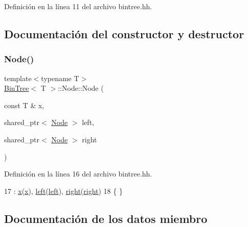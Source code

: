 Definición en la línea 11 del archivo bintree.\+hh.



\subsection{Documentación del constructor y destructor}
\mbox{\label{struct_bin_tree_1_1_node_af45885e303875c018e89fa5c8b96bde0}} 
\subsubsection{\texorpdfstring{Node()}{Node()}}
{\footnotesize\ttfamily template$<$typename T$>$ \\
\hyperlink{class_bin_tree}{Bin\+Tree}$<$ T $>$\+::Node\+::\+Node (\begin{DoxyParamCaption}\item[{const T \&}]{x,  }\item[{shared\+\_\+ptr$<$ \hyperlink{struct_bin_tree_1_1_node}{Node} $>$}]{left,  }\item[{shared\+\_\+ptr$<$ \hyperlink{struct_bin_tree_1_1_node}{Node} $>$}]{right }\end{DoxyParamCaption})}



Definición en la línea 16 del archivo bintree.\+hh.


\begin{DoxyCode}
17         :   \hyperlink{struct_bin_tree_1_1_node_a9c268d4af01559e8237dbeb5bd19af91}{x}(\hyperlink{struct_bin_tree_1_1_node_a9c268d4af01559e8237dbeb5bd19af91}{x}), \hyperlink{struct_bin_tree_1_1_node_a265a6367635a38838e6a6366564be78d}{left}(\hyperlink{struct_bin_tree_1_1_node_a265a6367635a38838e6a6366564be78d}{left}), \hyperlink{struct_bin_tree_1_1_node_a6df770137090da60cd0376ce06893cbd}{right}(\hyperlink{struct_bin_tree_1_1_node_a6df770137090da60cd0376ce06893cbd}{right})
18         \{   \}
\end{DoxyCode}


\subsection{Documentación de los datos miembro}
\mbox{\label{struct_bin_tree_1_1_node_a9c268d4af01559e8237dbeb5bd19af91}} 
